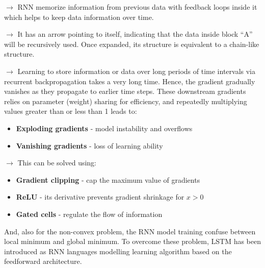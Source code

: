\documentclass[letterpaper, 10.5pt,landscape]{article}
\begin{document}
\begin{multicols*}{3}
$\rightarrow$ RNN memorize information from previous data with feedback loops inside it which helps to keep data information over time.


$\rightarrow$ It has an arrow pointing to itself, indicating that the data inside block “A” will be recursively used. Once expanded, its structure is equivalent to a chain-like structure. 

$\rightarrow$ Learning to store information or data over long periods of time intervals via recurrent backpropagation takes a very long time. Hence, the gradient gradually vanishes as they propagate to earlier time steps. These downstream gradients relies on parameter (weight) sharing for efficiency, and repeatedly multiplying values greater than or less than 1 leads to:

\begin{itemize}[label={--},leftmargin=4mm]
\vspace{-3pt}
\item \textbf{Exploding gradients} - model instability and overflows
\vspace{-3pt}
\item \textbf{Vanishing gradients} - loss of learning ability
\end{itemize}


$\rightarrow$ This can be solved using:
\begin{itemize}[label={--},leftmargin=4mm]
\vspace{-3pt}
\item \textbf{Gradient clipping} - cap the maximum value of gradients
\vspace{-3pt}
\item \textbf{ReLU} - its derivative prevents gradient shrinkage for $x > 0$
\vspace{-3pt}
\item \textbf{Gated cells} - regulate the flow of information
\end{itemize}

\vspace{3pt}

And, also for the non-convex problem, the RNN model training confuse between local minimum and global minimum. To overcome these problem, LSTM has been introduced as RNN languages modelling learning algorithm based on the feedforward architecture.

\vspace{-5pt}


\end{multicols*}
\end{document}
